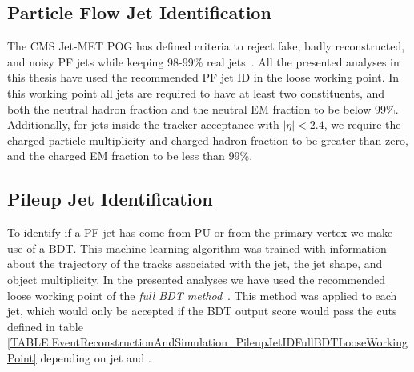 
\subsection{Particle Flow Jet Identification} 
\label{SECTION:EventReconstructionAndSimulation_Jets_ParticleFlowJetID}



The \gls{CMS} Jet-MET \gls{POG} has defined criteria to reject fake, badly reconstructed, and noisy \gls{PF} jets while keeping 98-99\% real jets~\cite{ARTICLE:CMSAN-14-227}. All the presented analyses in this thesis have used the recommended \gls{PF} jet \gls{ID} in the loose working point. In this working point all jets are required to have at least two constituents, and both the neutral hadron fraction and the neutral \gls{EM} fraction to be below 99\%. Additionally, for jets inside the tracker acceptance with $|\eta| < 2.4$, we require the charged particle multiplicity and charged hadron fraction to be greater than zero, and the charged \gls{EM} fraction to be less than 99\%.

\subsection{Pileup Jet Identification}
\label{SECTION:EventReconstructionAndSimulation_Jets_PileupJetID}



To identify if a \gls{PF} jet has come from \gls{PU} or from the primary vertex we make use of a \gls{BDT}. This machine learning algorithm was trained with information about the trajectory of the tracks associated with the jet, the jet shape, and object multiplicity. In the presented analyses we have used the recommended loose working point of the \textit{full \gls{BDT} method}~\cite{ARTICLE:CMS-PAS-JME-13-005}. This method was applied to each jet, which would only be accepted if the \gls{BDT} output score would pass the cuts defined in table \ref{TABLE:EventReconstructionAndSimulation_PileupJetIDFullBDTLooseWorkingPoint} depending on jet \pt and \eta.

